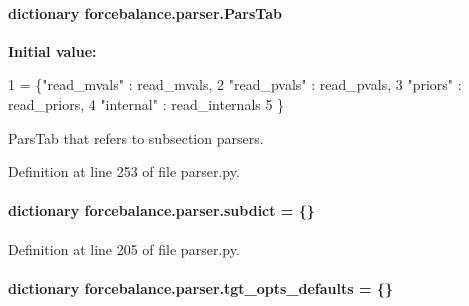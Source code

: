 \hypertarget{namespaceforcebalance_1_1parser_a492c80e361e80dc74aebc13e7a072dfb}{
\paragraph[{Pars\-Tab}]{\setlength{\rightskip}{0pt plus 5cm}dictionary forcebalance.\-parser.\-Pars\-Tab}}\label{namespaceforcebalance_1_1parser_a492c80e361e80dc74aebc13e7a072dfb}
{\bfseries Initial value\-:}
\begin{DoxyCode}
1 = \{\textcolor{stringliteral}{"read\_mvals"} : read\_mvals,
2             \textcolor{stringliteral}{"read\_pvals"} : read\_pvals,
3             \textcolor{stringliteral}{"priors"}     : read\_priors,
4             \textcolor{stringliteral}{"internal"}   : read\_internals
5             \}
\end{DoxyCode}


Pars\-Tab that refers to subsection parsers. 



Definition at line 253 of file parser.\-py.

\hypertarget{namespaceforcebalance_1_1parser_abb7a7e9723de629aa97727a85bcdbad1}{
\paragraph[{subdict}]{\setlength{\rightskip}{0pt plus 5cm}dictionary forcebalance.\-parser.\-subdict = \{\}}}\label{namespaceforcebalance_1_1parser_abb7a7e9723de629aa97727a85bcdbad1}


Definition at line 205 of file parser.\-py.

\hypertarget{namespaceforcebalance_1_1parser_aff4922444f06b7334a0994a835607393}{
\paragraph[{tgt\-\_\-opts\-\_\-defaults}]{\setlength{\rightskip}{0pt plus 5cm}dictionary forcebalance.\-parser.\-tgt\-\_\-opts\-\_\-defaults = \{\}}}\label{namespaceforcebalance_1_1parser_aff4922444f06b7334a0994a835607393}



